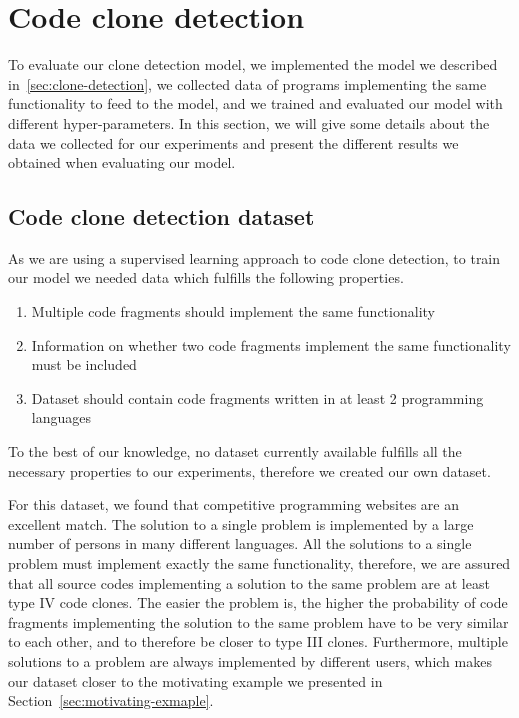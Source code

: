\section{\label{sec:clone-detection-experiments}Code clone detection}
To evaluate our clone detection model, we implemented the model we described
in~\ref{sec:clone-detection}, we collected data of programs implementing the
same functionality to feed to the model, and we trained and evaluated our model
with different hyper-parameters. In this section, we will give some details
about the data we collected for our experiments and present the different
results we obtained when evaluating our model.
\subsection{\label{ssec:clone-detection-dataset}Code clone detection dataset}
As we are using a supervised learning approach to code clone detection, to train
our model we needed data which fulfills the following properties.

\begin{enumerate}
\item Multiple code fragments should implement the same functionality
\item Information on whether two code fragments implement the same functionality
  must be included
\item Dataset should contain code fragments written in at least 2 programming
  languages
\end{enumerate}

To the best of our knowledge, no dataset currently available fulfills all the
necessary properties to our experiments, therefore we created our own dataset.

For this dataset, we found that competitive programming websites are an
excellent match. The solution to a single problem is implemented by a
large number of persons in many different languages. All the solutions to a
single problem must implement exactly the same functionality, therefore,
we are assured that all source codes implementing a solution to the same problem
are at least type IV code clones. The easier the problem is, the higher the
probability of code fragments implementing the solution to the same problem have
to be very similar to each other, and to therefore be closer to type III clones.
Furthermore, multiple solutions to a problem are always implemented by different
users, which makes our dataset closer to the motivating example we presented in
Section~\ref{sec:motivating-exmaple}.

